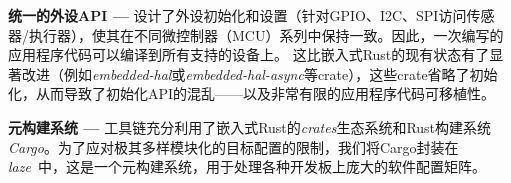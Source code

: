 \textbf{统一的外设API ---}
\OSname{}设计了外设初始化和设置（针对GPIO、I2C、SPI访问传感器/执行器），使其在不同微控制器（MCU）系列中保持一致。因此，一次编写的应用程序代码可以编译到所有\OSname{}支持的设备上。%
这比嵌入式Rust的现有状态有了显著改进（例如\emph{embedded-hal}或\emph{embedded-hal-async}等crate），这些crate省略了初始化，从而导致了初始化API的混乱——以及非常有限的应用程序代码可移植性。%


\textbf{元构建系统 ---}
\OSname{}工具链充分利用了嵌入式Rust的\emph{crates}生态系统和Rust构建系统\emph{Cargo}。为了应对极其多样模块化的目标配置的限制，我们将Cargo封装在\emph{laze}~\cite{laze}中，这是一个元构建系统，用于处理各种开发板上庞大的软件配置矩阵。%

